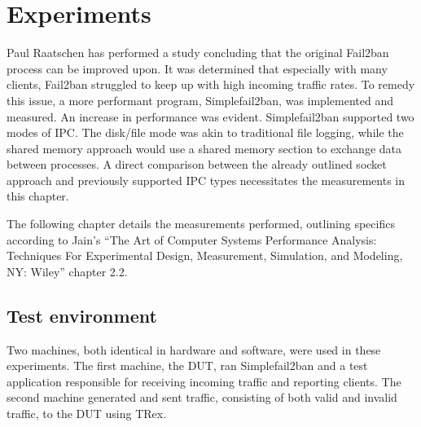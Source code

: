 %
%

\chapter{Experiments}\label{cha:experiments}
Paul Raatschen has performed a study\cite{raatschen:ipc} concluding that the original Fail2ban process can be improved upon.
It was determined that especially with many clients, Fail2ban struggled to keep up with high incoming traffic rates.
To remedy this issue, a more performant program, Simplefail2ban, was implemented and measured.
An increase in performance was evident.
Simplefail2ban supported two modes of \ac{IPC}.
The disk/file mode was akin to traditional file logging, while the shared memory approach would use a shared memory section to exchange data between processes.
A direct comparison between the already outlined socket approach and previously supported \ac{IPC} types necessitates the measurements in this chapter.

The following chapter details the measurements performed, outlining specifics according to Jain's
``The Art of Computer Systems Performance Analysis: Techniques For Experimental Design, Measurement, Simulation, and Modeling, NY\@: Wiley''\cite{jain:measurement} chapter 2.2.

\section{Test environment}
Two machines, both identical in hardware and software, were used in these experiments.
The first machine, the \ac{DUT}, ran Simplefail2ban and a test application responsible for receiving incoming traffic and reporting clients.
The second machine generated and sent traffic, consisting of both valid and invalid traffic, to the \ac{DUT} using TRex.


